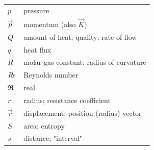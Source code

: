 \begin{table}[h]
\begin{center}
{\begin{tabular}{p{0.5cm} p{11cm}}
                $p$ & pressure\\
                $\vec{p}$ & momentum (also $\vec{K}$)\\
                $Q$ & amount of heat; quality; rate of flow\\
                $q$ & heat flux\\
                $R$ & molar gas constant; radius of curvature\\
                $R\hspace{-1pt}e$ & Reynolds number\\
                $\Re$ & real\\
                $r$ & radius; resistance coefficient\\
                $\vec{r}$ & displacement; position (radius) vector\\
                $S$ & area; entropy\\
                $s$ & distance; "interval"\\
			\end{tabular}
	}\end{center}
\end{table}

